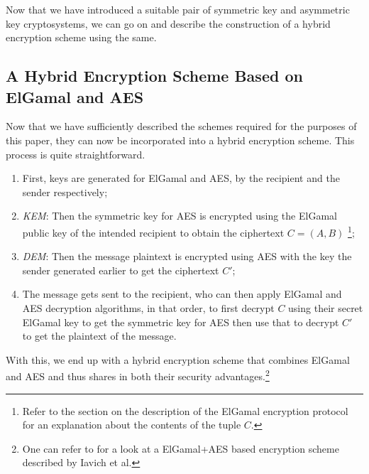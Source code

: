 Now that we have introduced a suitable pair of symmetric key and asymmetric key cryptosystems, we can go on and describe the construction of a hybrid encryption scheme using the same.

\subsection{A Hybrid Encryption Scheme Based on ElGamal and AES}

Now that we have sufficiently described the schemes required for the purposes of this paper, they can now be incorporated into a hybrid encryption scheme. 
This process is quite straightforward.

\begin{enumerate}
    \setlength\itemsep{1em}
    \item First, keys are generated for ElGamal and AES, by the recipient and the sender respectively;
    \item\emph{KEM}: Then the symmetric key for AES  is encrypted using the ElGamal public key of the intended recipient to obtain the ciphertext $C=(A,B)$\textsuperscript{   }\footnote{Refer to the section on the description of the ElGamal encryption protocol for an explanation about the contents of the tuple $C$.};
    \item\emph{DEM}: Then the message plaintext is encrypted using AES with the key the sender generated earlier to get the ciphertext $C'$;
    \item The message gets sent to the recipient, who can then apply ElGamal and AES decryption algorithms, in that order, to first decrypt $C$ using their secret ElGamal key to get the symmetric key for AES then use that to decrypt $C'$ to get the plaintext of the message.
\end{enumerate}
With this, we end up with a hybrid encryption scheme that combines ElGamal and AES and thus shares in both their security advantages.\footnote{One can refer to \cite{Iavich_Gnatyuk_Jintcharadze_Polishchuk_Odarchenko_2018} for a look at a ElGamal+AES based encryption scheme described by Iavich et al.}
